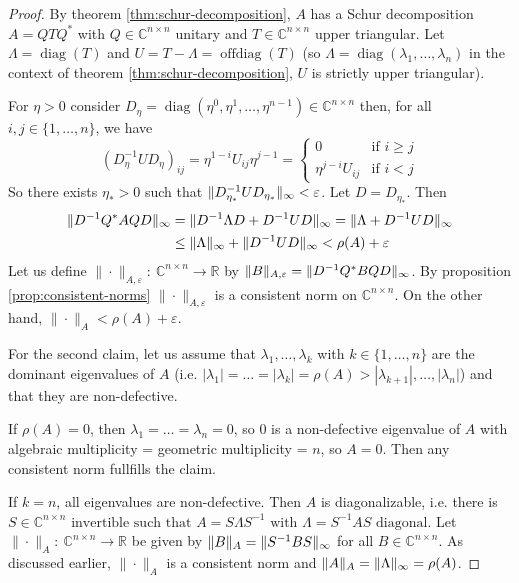 \documentclass[12pt]{article}
\theoremstyle{definition}
\theoremstyle{remark}
\numberwithin{equation}{section}
\newcommand{\R}{\mathbb{R}}
\newcommand{\C}{\mathbb{C}}
\newcommand{\normempty}{\|\cdot\|}
\DeclarePairedDelimiter{\norm}{\lVert}{\rVert}
\DeclareMathOperator{\diag}{diag}
\DeclareMathOperator{\offdiag}{offdiag}
\begin{document}
\begin{proof}
  By theorem \ref{thm:schur-decomposition}, $A$ has a Schur decomposition $A = QTQ^*$ with $Q \in \C^{n \times n}$ unitary and $T \in \C^{n \times n}$ upper triangular. Let $\Lambda = \diag(T)$ and $U = T - \Lambda = \offdiag(T)$ (so $\Lambda = \diag(\lambda_1,\ldots, \lambda_n)$ in the context of theorem \ref{thm:schur-decomposition}, $U$ is strictly upper triangular).

  For $\eta > 0$ consider $D_{\eta} = \diag(\eta^0, \eta^1, \ldots, \eta^{n-1}) \in \C^{n\times n}$ then, for all $i,j \in \{1,\ldots,n\}$, we have
  \begin{equation*}
    (D_{\eta}^{-1}UD_{\eta})_{ij} = \eta^{1-i}U_{ij}\eta^{j-1} =
    \begin{cases}
      0 & \text{if } i \geq j\\
      \eta^{j-i}U_{ij} & \text{if } i < j
    \end{cases}
  \end{equation*}
  So there exists $\eta_* > 0$ such that $\norm{D_{\eta_*}^{-1}UD_{\eta_*}}_{\infty} < \varepsilon$. Let $D= D_{\eta_{*}}$. Then
  \begin{align*}
    \norm{D^{-1}Q^*AQD}_{\infty} &= \norm{D^{-1}\Lambda D + D^{-1}UD}_{\infty} = \norm{\Lambda + D^{-1}UD}_{\infty} \\ &\leq \norm{\Lambda}_{\infty} + \norm{D^{-1}UD}_{\infty} < \rho(A) + \varepsilon
  \end{align*}
  Let us define $\normempty_{A,\varepsilon}:\ \C^{n\times n} \rightarrow \R$ by $\norm{B}_{A,\varepsilon} = \norm{D^{-1}Q^*BQD}_{\infty}$. By proposition \ref{prop:consistent-norms} $\normempty_{A,\varepsilon}$ is a consistent norm on $\C^{n \times n}$. On the other hand, $\normempty_{A} < \rho(A) + \varepsilon$.

  For the second claim, let us assume that $\lambda_1, \ldots, \lambda_k$ with $k \in \{1,\ldots,n\}$ are the dominant eigenvalues of $A$ (i.e. $|\lambda_1|=\ldots=|\lambda_k|=\rho(A)>|\lambda_{k+1}|,\ldots,|\lambda_n|$) and that they are non-defective.

  If $\rho(A)=0$, then $\lambda_1=\ldots =\lambda_n = 0$, so 0 is a non-defective eigenvalue of $A$ with algebraic multiplicity = geometric multiplicity = $n$, so $A=0$. Then any consistent norm fullfills the claim.

  If $k=n$, all eigenvalues are non-defective. Then $A$ is diagonalizable, i.e. there is $S \in \C^{n\times n} \text{ invertible such that } A=S\Lambda S^{-1} \text{ with } \Lambda = S^{-1}AS \text{ diagonal.}$
  Let $\normempty_{A}:\ \C^{n\times n} \rightarrow \R$ be given by $\norm{B}_{A} = \norm{S^{-1}BS}_{\infty}$ for all $B \in \C^{n \times n}$. As discussed earlier, $\normempty_{A}$ is a consistent norm and $\norm{A}_{A} = \norm{\Lambda}_{\infty} = \rho(A)$.


\end{proof}
\end{document}

